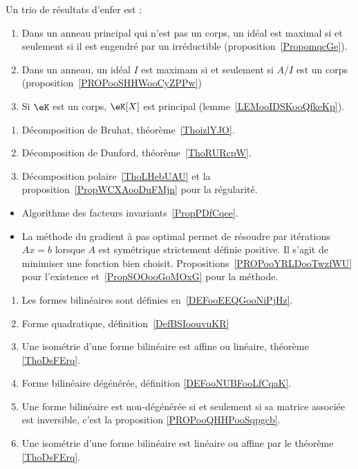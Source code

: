 Un trio de résultats d'enfer est :
\begin{enumerate}
    \item
        Dans un anneau principal qui n'est pas un corps, un idéal est maximal si et seulement si il est engendré par un irréductible (proposition~\ref{PropomqcGe}).
    \item
        Dans un anneau, un idéal \( I\) est maximam si et seulement si \( A/I\) est un corps (proposition~\ref{PROPooSHHWooCyZPPw})
    \item
        Si \( \eK\) est un corps, \( \eK[X]\) est principal (lemme~\ref{LEMooIDSKooQfkeKp}).
\end{enumerate}


   \label{DECooWTAIooNkZAFg}
\begin{enumerate}
    \item
        Décomposition de Bruhat, théorème~\ref{ThoizlYJO}.
    \item
        Décomposition de Dunford, théorème~\ref{ThoRURcpW}.
    \item
        Décomposition polaire~\ref{ThoLHebUAU} et la proposition~\ref{PropWCXAooDuFMjn} pour la régularité.
\end{enumerate}


\begin{itemize}
    \item Algorithme des facteurs invariants~\ref{PropPDfCqee}.
    \item La méthode du gradient à pas optimal permet de résoudre par itérations \( Ax=b\) lorsque \( A\) est symétrique strictement définie positive. Il s'agit de minimiser une fonction bien choisit. Propositions~\ref{PROPooYRLDooTwzfWU} pour l'existence et~\ref{PropSOOooGoMOxG} pour la méthode.
\end{itemize}


      \label{THEMEooOAJKooEvcCVn}
    \begin{enumerate}
\item
    Les formes bilinéaires sont définies en~\ref{DEFooEEQGooNiPjHz}.
\item
    Forme quadratique, définition~\ref{DefBSIoouvuKR}
\item
    Une isométrie d'une forme bilinéaire est affine ou linéaire, théorème \ref{ThoDsFErq}.
\item
    Forme bilinéaire dégénérée, définition \ref{DEFooNUBFooLfCqaK}.
\item
    Une forme bilinéaire est non-dégénérée si et seulement si sa matrice associée est inversible, c'est la proposition \ref{PROPooQHHPooSqpgcb}.
\item
    Une isométrie d'une forme bilinéaire est linéaire ou affine par le théorème \ref{ThoDsFErq}.
\end{enumerate}

